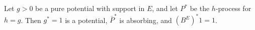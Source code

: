 Let $g > 0$ be a pure potential with support in $E$, and let $P^*$ be the $h$-process for $h = g$. Then $g^* = 1$ is a potential, $\bar{P}^*$ is absorbing, and $(B^E)^* 1 = 1$.
